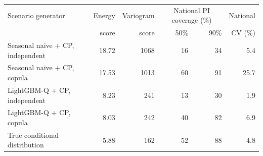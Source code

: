 \begin{tabular}{@{}lrrrrr@{}}\toprule
Scenario generator & Energy & Variogram & \multicolumn{2}{c}{National PI coverage (\%)} & National \\
 & score & score & 50\% & 90\% & CV (\%) \\ \midrule
Seasonal naive + CP, independent & 18.72 & 1068 & 16 & 34 & 5.4 \\
Seasonal naive + CP, copula & 17.53 & 1013 & 60 & 91 & 25.7 \\
LightGBM-Q + CP, independent & 8.23 & 241 & 13 & 30 & 1.9 \\
LightGBM-Q + CP, copula & 8.03 & 242 & 40 & 82 & 6.9 \\
True conditional distribution & 5.88 & 162 & 52 & 88 & 4.8 \\
\bottomrule\end{tabular}
